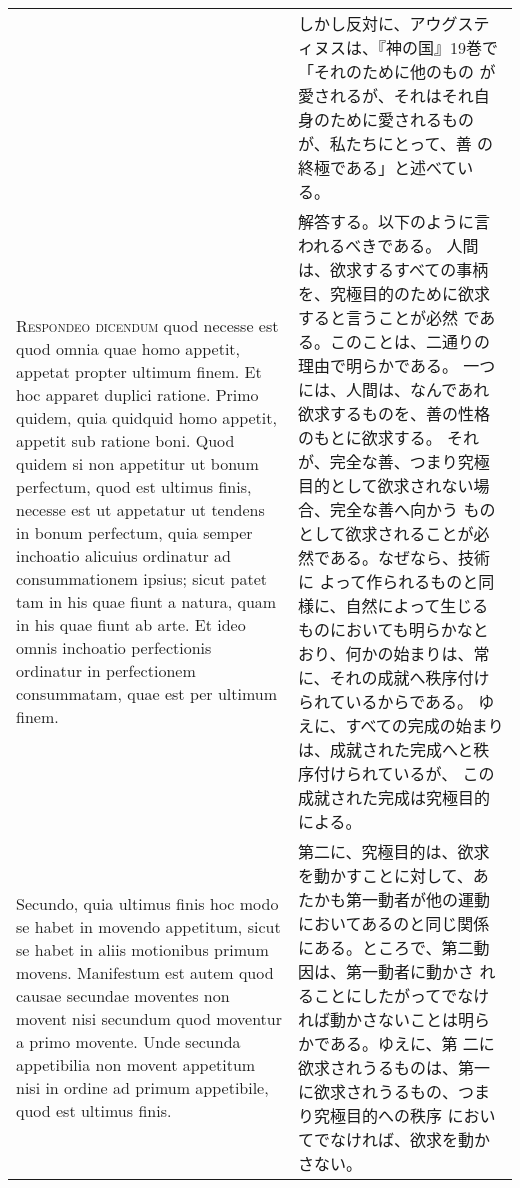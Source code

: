 \documentclass[10pt]{jsarticle} %
\begin{document}
\begin{longtable}{p{21em}p{21em}}
&


しかし反対に、アウグスティヌスは、『神の国』19巻で「それのために他のもの
 が愛されるが、それはそれ自身のために愛されるものが、私たちにとって、善
 の終極である」と述べている。


\\


{\scshape Respondeo dicendum} quod necesse est quod
omnia quae homo appetit, appetat propter ultimum finem. Et hoc apparet
duplici ratione. Primo quidem, quia quidquid homo appetit, appetit sub
ratione boni. Quod quidem si non appetitur ut bonum perfectum, quod est
ultimus finis, necesse est ut appetatur ut tendens in bonum perfectum,
quia semper inchoatio alicuius ordinatur ad consummationem ipsius; sicut
patet tam in his quae fiunt a natura, quam in his quae fiunt ab arte. Et
ideo omnis inchoatio perfectionis ordinatur in perfectionem consummatam,
quae est per ultimum finem. 


&

解答する。以下のように言われるべきである。
人間は、欲求するすべての事柄を、究極目的のために欲求すると言うことが必然
 である。このことは、二通りの理由で明らかである。
一つには、人間は、なんであれ欲求するものを、善の性格のもとに欲求する。
それが、完全な善、つまり究極目的として欲求されない場合、完全な善へ向かう
 ものとして欲求されることが必然である。なぜなら、技術に
 よって作られるものと同様に、自然によって生じるものにおいても明らかなと
 おり、何かの始まりは、常に、それの成就へ秩序付けられているからである。
ゆえに、すべての完成の始まりは、成就された完成へと秩序付けられているが、
 この成就された完成は究極目的による。



\\


Secundo, quia ultimus finis hoc modo se
habet in movendo appetitum, sicut se habet in aliis motionibus primum
movens. Manifestum est autem quod causae secundae moventes non movent
nisi secundum quod moventur a primo movente. Unde secunda appetibilia
non movent appetitum nisi in ordine ad primum appetibile, quod est
ultimus finis.

&

第二に、究極目的は、欲求を動かすことに対して、あたかも第一動者が他の運動
 においてあるのと同じ関係にある。ところで、第二動因は、第一動者に動かさ
 れることにしたがってでなければ動かさないことは明らかである。ゆえに、第
 二に欲求されうるものは、第一に欲求されうるもの、つまり究極目的への秩序
 においてでなければ、欲求を動かさない。


\\



\end{longtable}
\end{document}
